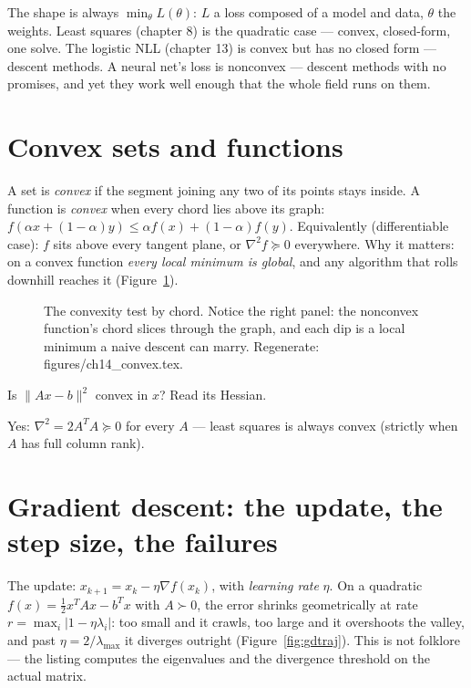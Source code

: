 The shape is always $\min_\theta L(\theta)$: $L$ a loss composed of a
model and data, $\theta$ the weights. Least squares
(chapter 8) is the quadratic case --- convex, closed-form, one solve.
The logistic NLL (chapter 13) is convex
but has no closed form --- descent methods. A neural net's loss is
nonconvex --- descent methods with no promises, and yet they work well
enough that the whole field runs on them.

\section{Convex sets and functions}\label{sec:opt-convex}

A set is \emph{convex} if the segment joining any two
of its points stays inside. A function is \emph{convex} when every chord lies above its graph:
$f(\alpha x+(1-\alpha)y)\le\alpha f(x)+(1-\alpha)f(y)$.
Equivalently (differentiable case): $f$ sits above every tangent plane,
or $\nabla^{2}f\succeq0$ everywhere. Why it matters: on a convex
function \emph{every local minimum is global}, and any algorithm that
rolls downhill reaches it (Figure~\ref{fig:convex}).

\begin{figure}[htbp]
\centering

\caption{The convexity test by chord. Notice the right panel: the
nonconvex function's chord slices through the graph, and each dip is a
local minimum a naive descent can marry. Regenerate:
\ttfamily figures/ch14\_convex.tex.}
\label{fig:convex}
\end{figure}

\begin{exercise}[easy]
Is $\|Ax-b\|^2$ convex in $x$? Read its Hessian.
\begin{solution}
Yes: $\nabla^2 = 2A^TA\succeq0$ for every $A$ --- least squares is
always convex (strictly when $A$ has full column rank).
\end{solution}
\end{exercise}

\section{Gradient descent: the update, the step size, the failures}
\label{sec:opt-gd}

The update: $x_{k+1}=x_k-\eta\nabla f(x_k)$,
with \emph{learning rate} $\eta$. On a quadratic
$f(x)=\tfrac12 x^TAx-b^Tx$ with $A\succ0$, the error shrinks
geometrically at rate $r=\max_i|1-\eta\lambda_i|$: too small and it
crawls, too large and it overshoots the valley, and past
$\eta=2/\lambda_{\max}$ it diverges outright
(Figure~\ref{fig:gdtraj}). This is not folklore --- the listing
computes the eigenvalues and the divergence threshold on the actual
matrix.

